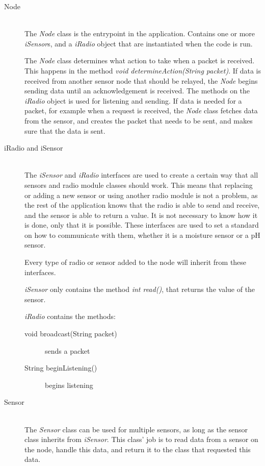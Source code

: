\begin{description}
\item[Node] \hfill \\
The \textit{Node} class is the entrypoint in the application.
Contains one or more \textit{iSensor}s, and a \textit{iRadio} object that are instantiated when the code is run.

The \textit{Node} class determines what action to take when a packet is received. This happens in the method \textit{void determineAction(String packet)}. 
If data is received from another sensor node that should be relayed, the \textit{Node} begins sending data until an acknowledgement is received. The methods on the \textit{iRadio} object is used for listening and sending.
If data is needed for a packet, for example when a request is received, the \textit{Node} class fetches data from the sensor, and creates the packet that needs to be sent, and makes sure that the data is sent.

\item[iRadio and iSensor] \hfill \\
The \textit{iSensor} and \textit{iRadio} interfaces are used to create a certain way that all sensors and radio module classes should work. This means that replacing or adding a new sensor or using another radio module is not a problem, as the rest of the application knows that the radio is able to send and receive, and the sensor is able to return a value. 
It is not necessary to know how it is done, only that it is possible. These interfaces are used to set a standard on how to communicate with them, whether it is a moisture sensor or a pH sensor.

Every type of radio or sensor added to the node will inherit from these interfaces.


\textit{iSensor} only contains the method \textit{int read()}, that returns the value of the sensor.

\textit{iRadio} contains the methods:
\begin{description}
\item[void broadcast(String packet)] sends a packet
\item[String beginListening()] begins listening
\end{description}

\item[Sensor] \hfill \\
The \textit{Sensor} class can be used for multiple sensors, as long as the sensor class inherits from \textit{iSensor}. This class' job is to read data from a sensor on the node, handle this data, and return it to the class that requested this data.


\end{description}
